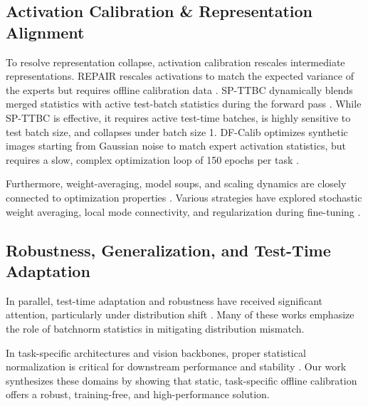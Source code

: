 \documentclass{article}
\theoremstyle{plain}
\theoremstyle{definition}
\theoremstyle{remark}
\begin{document}
\subsection{Activation Calibration \& Representation Alignment}
To resolve representation collapse, activation calibration rescales intermediate representations. REPAIR rescales activations to match the expected variance of the experts but requires offline calibration data \cite{jordan2023repair}. SP-TTBC dynamically blends merged statistics with active test-batch statistics during the forward pass \cite{spttbc2026}. While SP-TTBC is effective, it requires active test-time batches, is highly sensitive to test batch size, and collapses under batch size 1. DF-Calib optimizes synthetic images starting from Gaussian noise to match expert activation statistics, but requires a slow, complex optimization loop of 150 epochs per task \cite{dfcalib2026}.

Furthermore, weight-averaging, model soups, and scaling dynamics are closely connected to optimization properties \cite{devlin2018bert, radford2019language, liang2022pragmatic}. Various strategies have explored stochastic weight averaging, local mode connectivity, and regularization during fine-tuning \cite{athiwaratkun2018improving, maddox2019simple, nikishin2018improving, zimmer2023sparse, gu2023hierarchical, lu2023improving, wasfy2023enhancing, sarkar2024enhancing, kaddour2022fair, yang2024surgeryv2, guo2022stochastic, confounder2026}.

\subsection{Robustness, Generalization, and Test-Time Adaptation}
In parallel, test-time adaptation and robustness have received significant attention, particularly under distribution shift \cite{wang2021tent, lin2024robust, zhang2022unseen, liu2024robust, jang2023personalized, ran2022improved, lykourinas2024unsupervised, khan2024sok, li2025continual, niu2023towards}. Many of these works emphasize the role of batchnorm statistics in mitigating distribution mismatch.

In task-specific architectures and vision backbones, proper statistical normalization is critical for downstream performance and stability \cite{croce2023seasoning, park2024vio, bahri2025smart, cao2024deep, afraji2025integrated, xie2025bone, rai2025label, nam2022improving, zou2022learning, seckler2022bayesian, su2023towards, chen2024local, karmanov2024efficient, xia2024discriminative, xie2023dirichlet, zhang2025control, wang2024dynamic, wang2024unified, kim2024methodology}. Our work synthesizes these domains by showing that static, task-specific offline calibration offers a robust, training-free, and high-performance solution.
\end{document}
